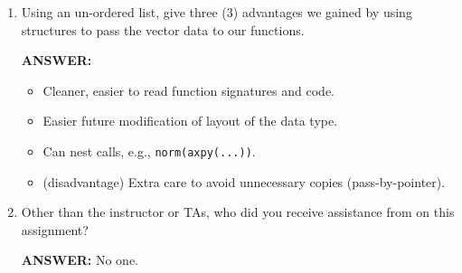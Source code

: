 \documentclass[letter]{article}
\begin{document}
\begin{enumerate}
    \item Using an un-ordered list, give three (3) advantages we gained by using structures to pass the vector data to our functions.
    
    \textbf{ANSWER:}
    \begin{itemize}
        \item Cleaner, easier to read function signatures and code.
        \item Easier future modification of layout of the data type.
        \item Can nest calls, e.g., \texttt{norm(axpy(...))}.
        \item (disadvantage) Extra care to avoid unnecessary copies (pass-by-pointer).
    \end{itemize}

    \item Other than the instructor or TAs, who did you receive assistance from on this assignment?
    
    \textbf{ANSWER:} No one.
\end{enumerate}




% 
% 
\end{document}
